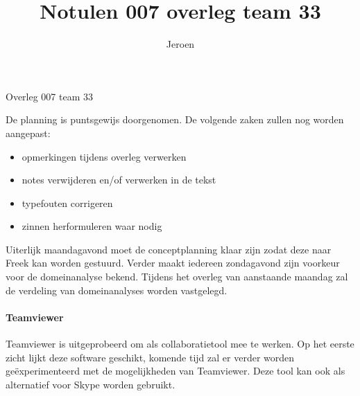 \documentclass{article}
\title{Notulen 007 overleg team 33}
\author{Jeroen}
\begin{document}

\begin{Minutes}{Overleg 007 team 33}

\maketitle%


De planning is puntsgewijs doorgenomen. De volgende zaken zullen nog worden aangepast:
\begin{itemize}
 \item opmerkingen tijdens overleg verwerken
 \item notes verwijderen en/of verwerken in de tekst
 \item typefouten corrigeren
 \item zinnen herformuleren waar nodig
\end{itemize}

Uiterlijk maandagavond moet de conceptplanning klaar zijn zodat deze naar Freek kan worden gestuurd. Verder maakt iedereen
zondagavond zijn voorkeur voor de domeinanalyse bekend. Tijdens het overleg van aanstaande maandag zal de verdeling van
domeinanalyses worden vastgelegd.

\paragraph{Teamviewer}
Teamviewer is uitgeprobeerd om als collaboratietool mee te werken. Op het eerste zicht lijkt deze software geschikt, komende
tijd zal er verder worden ge\"experimenteerd met de mogelijkheden van Teamviewer. Deze tool kan ook als alternatief voor
Skype worden gebruikt.


\end{Minutes}
\end{document}
